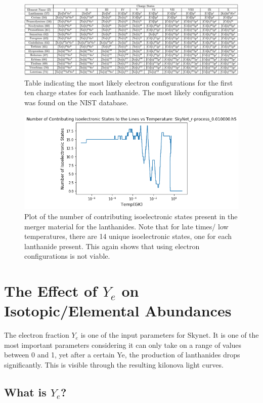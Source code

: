 \documentclass[11pt,a4paper]{article}
\begin{document}
\begin{figure}[h!]
  \includegraphics[scale = .65]{configurations.png}
  \caption{Table indicating the most likely electron configurations for the first ten charge states for each lanthanide. The most likely configuration was found on the NIST database.}
\end{figure}

\begin{figure}[h!]
  \includegraphics[scale = .6]{isoelectronic.png}
  \centering
  \caption{Plot of the number of contributing isoelectronic states present in the merger material for the lanthanides. Note that for late times/ low temperatures, there are 14 unique isoelectronic states, one for each lanthanide present. This again shows that using electron configurations is not viable. }
\end{figure}


\section{The Effect of $Y_e$ on Isotopic/Elemental Abundances}  

The electron fraction $Y_e$ is one of the input parameters for Skynet. It is one of the most important parameters considering it can only take on a range of values between 0 and 1, yet after a certain Ye, the production of lanthanides drops significantly. This is visible through the resulting kilonova light curves. 

\subsection{What is $Y_e$?}
\end{document}
